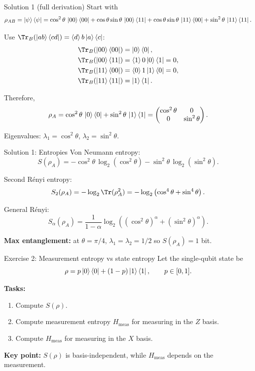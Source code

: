 \documentclass[aspectratio=169]{beamer}
\begin{document}
\begin{frame}{Solution 1 (full derivation)}
Start with
\[
\rho_{AB}=\ket{\psi}\bra{\psi}=
\cos^2\theta\,\ket{00}\bra{00}
+\cos\theta\sin\theta\,\ket{00}\bra{11}
+\cos\theta\sin\theta\,\ket{11}\bra{00}
+\sin^2\theta\,\ket{11}\bra{11}.
\]

Use $\Tr_B(\ket{ab}\bra{cd})=\braket{d}{b}\ket{a}\bra{c}$:
\begin{align}
\Tr_B(\ket{00}\bra{00})&=\ket{0}\bra{0},\\
\Tr_B(\ket{00}\bra{11})&=\braket{1}{0}\ket{0}\bra{1}=0,\\
\Tr_B(\ket{11}\bra{00})&=\braket{0}{1}\ket{1}\bra{0}=0,\\
\Tr_B(\ket{11}\bra{11})&=\ket{1}\bra{1}.
\end{align}

Therefore,
\[
\rho_A=\cos^2\theta\,\ket{0}\bra{0}+\sin^2\theta\,\ket{1}\bra{1}
=\begin{pmatrix}
\cos^2\theta & 0\\
0 & \sin^2\theta
\end{pmatrix}.
\]

Eigenvalues: $\lambda_1=\cos^2\theta$, $\lambda_2=\sin^2\theta$.
\end{frame}

\begin{frame}{Solution 1: Entropies}
Von Neumann entropy:
\[
S(\rho_A)=-\cos^2\theta\,\log_2(\cos^2\theta)-\sin^2\theta\,\log_2(\sin^2\theta).
\]

Second Rényi entropy:
\[
S_2(\rho_A)=-\log_2\Tr(\rho_A^2)
=-\log_2\left(\cos^4\theta+\sin^4\theta\right).
\]

General Rényi:
\[
S_\alpha(\rho_A)=\frac{1}{1-\alpha}\log_2\left((\cos^2\theta)^\alpha+(\sin^2\theta)^\alpha\right).
\]

\medskip
\textbf{Max entanglement:} at $\theta=\pi/4$,
$\lambda_1=\lambda_2=1/2$ so $S(\rho_A)=1$ bit.
\end{frame}

\begin{frame}{Exercise 2: Measurement entropy vs state entropy}
Let the single-qubit state be
\[
\rho = p\ket{0}\bra{0}+(1-p)\ket{1}\bra{1},\qquad p\in[0,1].
\]

\textbf{Tasks:}
\begin{enumerate}
\item Compute $S(\rho)$.
\item Compute measurement entropy $H_{\text{meas}}$ for measuring in the $Z$ basis.
\item Compute $H_{\text{meas}}$ for measuring in the $X$ basis.
\end{enumerate}

\medskip
\textbf{Key point:} $S(\rho)$ is basis-independent, while $H_{\text{meas}}$ depends on the measurement.
\end{frame}
\end{document}
